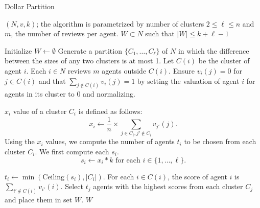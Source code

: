 \documentclass[letterpaper]{article}
\renewcommand{\algorithmicrequire}{\textbf{Input:}}
\renewcommand{\algorithmicensure}{\textbf{Output:}}
\newlength{\wordlength}
\newcommand{\wordbox}[3][c]{\settowidth{\wordlength}{#3}\makebox[\wordlength][#1]{#2}}
\begin{document}
		\begin{algorithm}[ht!]
		 \caption{Dollar Partition}
		 \label{algo:DP}
		\renewcommand{\algorithmicrequire}{\wordbox[l]{\textbf{Input}:}{\textbf{Output}:}}
		 \renewcommand{\algorithmicensure}{\wordbox[l]{\textbf{Output}:}{\textbf{Output}:}}
		\footnotesize
		\begin{algorithmic}
			\footnotesize
			\REQUIRE $(N,v,k)$; the algorithm is parametrized by number of clusters $2\leq \ell\leq n$ and $m$, the number of reviews per agent.
			\ENSURE $W\subset N$ such that $|W|\leq k+\ell-1$
		\end{algorithmic}
		 \begin{algorithmic}[1]
				\footnotesize

			 \STATE Initialize $W\longleftarrow \emptyset$
			 \STATE Generate a partition $\{C_1,\ldots, C_{\ell}\}$ of $N$ in which the difference between the sizes of any two clusters is at most 1. Let $C(i)$ be the cluster of agent $i$. %
			 \STATE
			 Each $i\in N$ reviews $m$ agents outside $C(i)$.
			 Ensure $v_i(j)=0$ for $j\in C(i)$ and that $\sum_{j\notin C(i)}v_i(j)=1$ by setting the valuation of agent $i$ for agents in its cluster to $0$ and normalizing.

		 \STATE $x_i$ value of a cluster $C_i$ is defined as follows:
			 \[x_i\longleftarrow \frac{1}{n} \times \sum_{j\in C_i, j'\notin C_i}v_{j'}(j).\]
			 \STATE Using the $x_i$ values, we compute the number of agents $t_i$ to be chosen from each cluster $C_i$. We first compute each $s_i$.
 \[s_i\longleftarrow x_i * k \text{ for each } i\in \{1,\ldots, \ell\}.\]


			 			 \FOR{each $i\in \{1,\ldots, \ell\}$}
			 			 \STATE $t_i \longleftarrow \min(\text{Ceiling}{(s_i)}, |C_i|)$.
			 			 \ENDFOR
				\STATE For each $i\in C(i)$, the score of agent $i$ is
				 $\sum_{i'\notin C(i)}v_{i'}(i).$
				 \STATE Select $t_j$ agents with the highest scores from each cluster $C_j$ and place them in set $W$.
			\RETURN $W$
		 \end{algorithmic}
		\end{algorithm}
\end{document}
